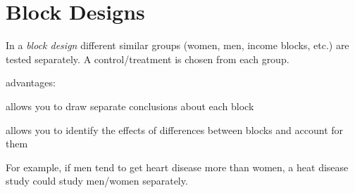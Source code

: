 \documentclass[landscape]{exam}
\begin{document}
  \section{Block Designs}
    In a {\em block design\/} different similar groups (women, men, income blocks,
    etc.) are tested separately.  A control/treatment is chosen from each group.  

    advantages:
    \begin{itemize*}
      \item allows you to draw separate conclusions about each block
      \item allows you to identify the effects of differences between blocks and
        account for them
    \end{itemize*}

    For example, if men tend to get heart disease more than women, a heat
    disease study could study men/women separately.
\end{document}
